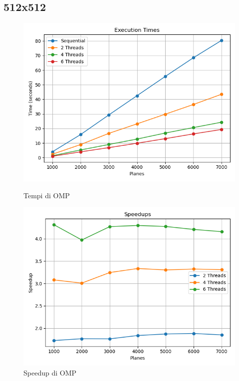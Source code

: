 \documentclass[11pt]{article}
\begin{document}
    \subsection{512x512}\label{subsec:512x512}
    \begin{figure}[H]
        \centering
        \begin{minipage}{0.49\textwidth}
            \centering
            \includegraphics[width=\textwidth]{plots/512/omp_times}
            \caption{Tempi di OMP}\label{fig:times-512-omp}
        \end{minipage}
        \begin{minipage}{0.49\textwidth}
            \centering
            \includegraphics[width=\textwidth]{plots/512/omp_speedup}
            \caption{Speedup di OMP}\label{fig:speedup-512-omp}
        \end{minipage}
    \end{figure}
\end{document}
